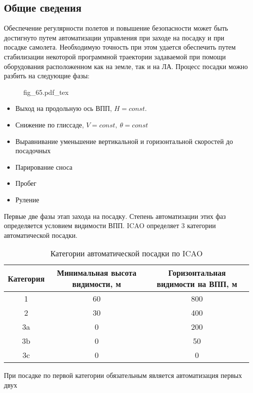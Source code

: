 \documentclass{article}
\newcommand{\incfig}[1]{
    {#1.pdf_tex}
}
\begin{document}
\subsection{Общие сведения}
Обеспечение регулярности полетов и повышение безопасности может быть достигнуто
путем автоматизации управления при заходе на посадку и при посадке самолета.
Необходимую точность при этом удается обеспечить путем стабилизации некоторой
программной траектории задаваемой при помощи оборудования расположенном как на
земле, так и на ЛА.
Процесс посадки можно разбить на следующие фазы:
\begin{figure}[H]
    \centering
    \incfig{fig_65}
    \label{fig:fig_65}
\end{figure}
\begin{itemize}
    \item  Выход на продольную ось ВПП, $H=const$.
    \item Снижение по глиссаде, $V=const, \ \theta = const$
    \item Выравнивание уменьшение вертикальной и горизонтальной скоростей до
        посадочных
    \item Парирование сноса
    \item Пробег
    \item Руление
\end{itemize}
Первые две фазы этап захода на посадку. Степень автоматизации этих фаз
определяется условием видимости ВПП. ICAO определяет 3 категории
автоматической посадки.
\begin{table}[H]
    \centering
    \caption{Категории автоматической посадки по ICAO}
    \label{tab:label}
    \begin{tabular}{|c|c|c|}
        \toprule
        Категория & Минимальная высота видимости, м & Горизонтальная видимости
        на ВПП, м \\
        \midrule
        1         & 60                              & 800
        \\
        2         & 30                              & 400
        \\
        3a        & 0                               & 200
        \\
        3b        & 0                               & 50
        \\
        3c        & 0                               & 0
        \\
        \bottomrule
    \end{tabular}
\end{table}
При посадке по первой категории обязательным является автоматизация первых двух
\end{document}
